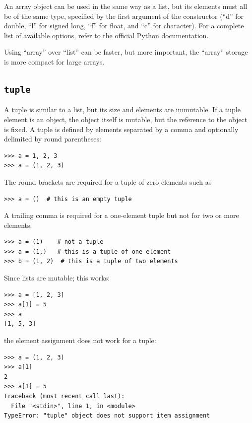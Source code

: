\documentclass[justified, sixbynine]{tufte-book}
\def\ft{\small\tt}
\theoremstyle{plain}%
\newtheorem * {corollary}{Corollary}
\theoremstyle{definition}
\theoremstyle{remark}
\newtheorem * {remark}{Remark}
\newtheorem * {note}{Note}
\begin{document}
\begin{fullwidth}
An array object can be used in the same way as a list, but its elements must all be of the same type, specified by the first argument of the constructor (``d'' for double, ``l'' for signed long, ``f'' for float, and ``c'' for character).  For a complete list of available options, refer to the official Python documentation.

Using ``array'' over ``list'' can be faster, but more important, the ``array'' storage is more compact for large arrays.

\goodbreak\subsection{{\ft tuple}}


A tuple is similar to a list, but its size and elements are immutable. If a tuple element is an object, the object itself is mutable, but the reference to the object is fixed. A tuple is defined by elements separated by a comma and optionally delimited by round parentheses:

\begin{lstlisting}
>>> a = 1, 2, 3
>>> a = (1, 2, 3)
\end{lstlisting}

The round brackets are required for a tuple of zero elements such as
\begin{lstlisting}
>>> a = ()  # this is an empty tuple
\end{lstlisting}

A trailing comma is required for a one-element tuple but not for two or more elements:
\begin{lstlisting}
>>> a = (1)    # not a tuple
>>> a = (1,)   # this is a tuple of one element
>>> b = (1, 2)  # this is a tuple of two elements
\end{lstlisting}

Since lists are mutable; this works:
\begin{lstlisting}
>>> a = [1, 2, 3]
>>> a[1] = 5
>>> a
[1, 5, 3]
\end{lstlisting}
\noindent the element assignment does not work for a tuple:
\begin{lstlisting}
>>> a = (1, 2, 3)
>>> a[1]
2
>>> a[1] = 5
Traceback (most recent call last):
  File "<stdin>", line 1, in <module>
TypeError: "tuple" object does not support item assignment
\end{lstlisting}


\end{fullwidth}
\end{document}
